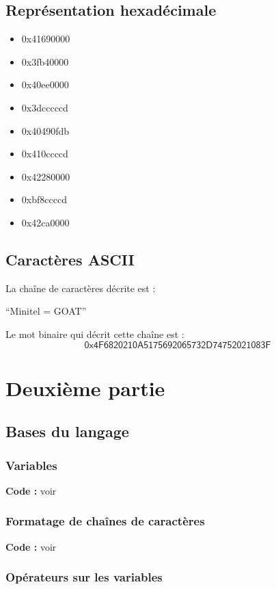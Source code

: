 \documentclass[../main.tex]{subfiles}
\begin{document}
\subsection{Représentation hexadécimale}
\begin{itemize}
	\item 0\textsf{x}41690000
	\item 0\textsf{x}3fb40000
	\item 0\textsf{x}40ee0000
	\item 0\textsf{x}3dcccccd
	\item 0\textsf{x}40490fdb
	\item 0\textsf{x}410ccccd
	\item 0\textsf{x}42280000
	\item 0\textsf{x}bf8ccccd
	\item 0\textsf{x}42ca0000
\end{itemize}
\subsection{Caractères ASCII}
 La chaîne de caractères décrite est : 
\begin{center}
``Minitel = GOAT''
\end{center}
 Le mot binaire qui décrit cette chaîne est :
$$\textsf{0x4F6820210A5175692065732D74752021083F}$$
\section{Deuxième partie}
\subsection{Bases du langage}
\subsubsection{Variables}

\textbf{Code :} voir 
\subsubsection{Formatage de chaînes de caractères}

\textbf{Code :} voir 
\subsubsection{Opérateurs sur les variables}
 
\end{document}
